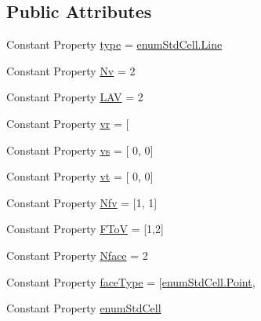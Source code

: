 \subsection*{Public Attributes}
\begin{DoxyCompactItemize}
\item 
Constant Property \hyperlink{class_std_line_a9d3e0fb400f46f89996c1202bab6593b}{type} = \hyperlink{classenum_std_cell_ac4c2fa4e189e76e103f3ff9b1d19b9e7afd257c7a2b7d6efb3bd9f67c8a36d3cd}{enum\+Std\+Cell.\+Line}
\item 
Constant Property \hyperlink{class_std_line_a3e9bfcad0d9700b242c1ca5b70ef37c3}{Nv} = 2
\item 
Constant Property \hyperlink{class_std_line_a41e70ea416de0c8ff46d89da8904ac6a}{L\+AV} = 2
\item 
Constant Property \hyperlink{class_std_line_a91fd0e5061ea26162737d6820a12604e}{vr} = \mbox{[}
\item 
Constant Property \hyperlink{class_std_line_a08ece13617006002fcf0ddc15dbdab8e}{vs} = \mbox{[} 0, 0\mbox{]}\textquotesingle{}
\item 
Constant Property \hyperlink{class_std_line_a6ab5371552e38c477208bd2671b5fd44}{vt} = \mbox{[} 0, 0\mbox{]}\textquotesingle{}
\item 
Constant Property \hyperlink{class_std_line_a489ccf1aa8117706e16d358a2745eadd}{Nfv} = \mbox{[}1, 1\mbox{]}\textquotesingle{}
\item 
Constant Property \hyperlink{class_std_line_adc5d41dc29acfdd19dea3ef66a26116f}{F\+ToV} = \mbox{[}1,2\mbox{]}
\item 
Constant Property \hyperlink{class_std_line_a26ccc52206bdbdc35ef705588f527fa2}{Nface} = 2
\item 
Constant Property \hyperlink{class_std_line_a1eaf548c1295fc34fefab9ed02284b53}{face\+Type} = \mbox{[}\hyperlink{classenum_std_cell_ac4c2fa4e189e76e103f3ff9b1d19b9e7a055fa6159d5be915a3c9df01d16d5bb7}{enum\+Std\+Cell.\+Point},
\item 
Constant Property \hyperlink{class_std_line_ac359f91231d2c83bebc2f2f81b7964bf}{enum\+Std\+Cell}
\end{DoxyCompactItemize}
